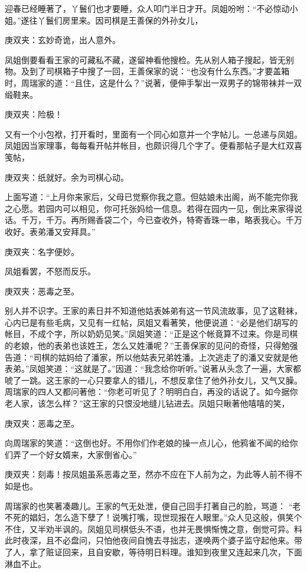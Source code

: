 \begin{parag}
    迎春已经睡著了，丫鬟们也才要睡，众人叩门半日才开。凤姐吩咐：“不必惊动小姐。”遂往丫鬟们房里来。因司棋是王善保的外孙女儿，\begin{note}庚双夹：玄妙奇诡，出人意外。\end{note}凤姐倒要看看王家的可藏私不藏，遂留神看他搜检。先从别人箱子搜起，皆无别物。及到了司棋箱子中搜了一回，王善保家的说：“也没有什么东西。”才要盖箱时，周瑞家的道：“且住，这是什么？”说著，便伸手掣出一双男子的锦带袜并一双缎鞋来。\begin{note}庚双夹：险极！\end{note}又有一个小包袱，打开看时，里面有一个同心如意并一个字帖儿。一总递与凤姐。凤姐因当家理事，每每看开帖并帐目，也颇识得几个字了。便看那帖子是大红双喜笺帖，\begin{note}庚双夹：纸就好。余为司棋心动。\end{note}上面写道：“上月你来家后，父母已觉察你我之意。但姑娘未出阁，尚不能完你我之心愿。若园内可以相见，你可托张妈给一信息。若得在园内一见，倒比来家得说话。千万，千万。再所赐香袋二个，今已查收外，特寄香珠一串，略表我心。千万收好。表弟潘又安拜具。”\begin{note}庚双夹：名字便妙。\end{note}凤姐看罢，不怒而反乐。\begin{note}庚双夹：恶毒之至。\end{note}别人并不识字。王家的素日并不知道他姑表姊弟有这一节风流故事，见了这鞋袜，心内已是有些毛病，又见有一红帖，凤姐又看著笑，他便说道：“必是他们胡写的帐目，不成个字，所以奶奶见笑。”凤姐笑道：“正是这个帐竟算不过来。你是司棋的老娘，他的表弟也该姓王，怎么又姓潘呢？”王善保家的见问的奇怪，只得勉强告道：“司棋的姑妈给了潘家，所以他姑表兄弟姓潘。上次逃走了的潘又安就是他表弟。”凤姐笑道：“这就是了。”因道：“我念给你听听。”说著从头念了一遍，大家都唬了一跳。这王家的一心只要拿人的错儿，不想反拿住了他外孙女儿，又气又臊。周瑞家的四人又都问著他：“你老可听见了？明明白白，再没的话说了。如今据你老人家，该怎么样？”这王家的只恨没地缝儿钻进去。凤姐只瞅著他嘻嘻的笑，\begin{note}庚双夹：恶毒之至。\end{note}向周瑞家的笑道：“这倒也好。不用你们作老娘的操一点儿心，他鸦雀不闻的给你们弄了一个好女婿来，大家倒省心。”\begin{note}庚双夹：刻毒！按凤姐虽系恶毒之至，然亦不应在下人前为之，为此等人前不得不如是也。\end{note}周瑞家的也笑著凑趣儿。王家的气无处泄，便自己回手打著自己的脸，骂道： “老不死的娼妇，怎么造下孽了！说嘴打嘴，现世现报在人眼里。”众人见这般，俱笑个不住，又半劝半讽的。凤姐见司棋低头不语，也并无畏惧惭愧之意，倒觉可异。料此时夜深，且不必盘问，只怕他夜间自愧去寻拙志，遂唤两个婆子监守起他来。带了人，拿了赃证回来，且自安歇，等待明日料理。谁知到夜里又连起来几次，下面淋血不止。
\end{parag}


